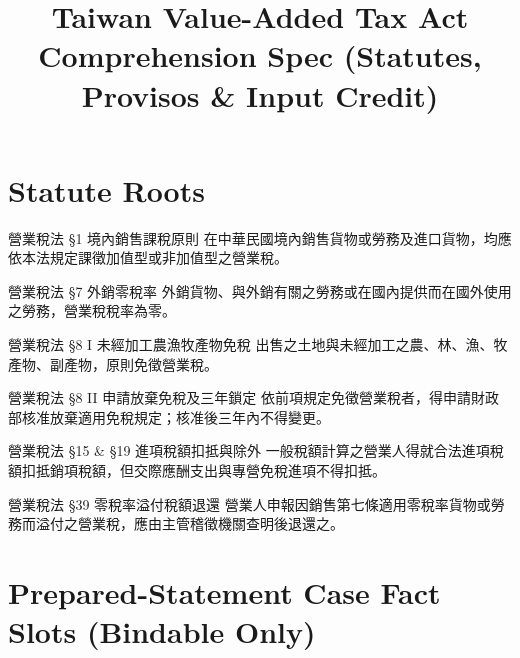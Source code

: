 \documentclass[11pt]{article}
\title{Taiwan Value-Added Tax Act Comprehension Spec (Statutes, Provisos \& Input Credit)}
\date{}
\begin{document}
\maketitle

\soundnodirectclaim

\section{Statute Roots}

\begin{soundstatute}[id=stat_art1_levy]{營業稅法 §1 境內銷售課稅原則}
\label{stat:vat1}
在中華民國境內銷售貨物或勞務及進口貨物，均應依本法規定課徵加值型或非加值型之營業稅。
\end{soundstatute}

\begin{soundstatute}[id=stat_art7_zero]{營業稅法 §7 外銷零稅率}
\label{stat:vat7}
外銷貨物、與外銷有關之勞務或在國內提供而在國外使用之勞務，營業稅稅率為零。
\end{soundstatute}

\begin{soundstatute}[id=stat_art8_exempt]{營業稅法 §8 I 未經加工農漁牧產物免稅}
\label{stat:vat8}
出售之土地與未經加工之農、林、漁、牧產物、副產物，原則免徵營業稅。
\end{soundstatute}

\begin{soundstatute}[id=stat_art8_waive]{營業稅法 §8 II 申請放棄免稅及三年鎖定}
\label{stat:vat8w}
依前項規定免徵營業稅者，得申請財政部核准放棄適用免稅規定；核准後三年內不得變更。
\end{soundstatute}

\begin{soundstatute}[id=stat_art19_cred]{營業稅法 §15 \& §19 進項稅額扣抵與除外}
\label{stat:vat19}
一般稅額計算之營業人得就合法進項稅額扣抵銷項稅額，但交際應酬支出與專營免稅進項不得扣抵。
\end{soundstatute}

\begin{soundstatute}[id=stat_art39_refund]{營業稅法 §39 零稅率溢付稅額退還}
\label{stat:vat39}
營業人申報因銷售第七條適用零稅率貨物或勞務而溢付之營業稅，應由主管稽徵機關查明後退還之。
\end{soundstatute}

\section{Prepared-Statement Case Fact Slots (Bindable Only)}
\end{document}
